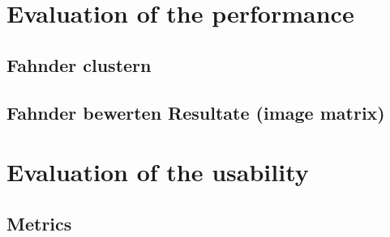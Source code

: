 \section{Evaluation of the performance}\label{sec:evaluation-performance}

\subsection*{Fahnder clustern}\label{subsec:evaluation-metric1}

\subsection*{Fahnder bewerten Resultate (image matrix)}\label{subsec:evaluation-metric2}

\section{Evaluation of the usability}\label{sec:evaluation-usability}

\subsection*{Metrics}\label{subsec:evaluation-metrics}
